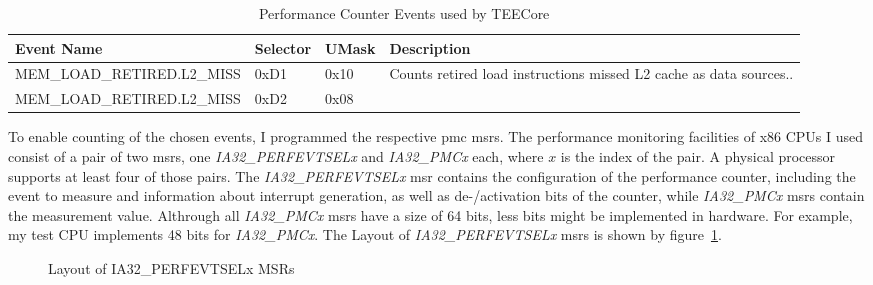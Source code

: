 \begin{table}[!h]
    \begin{center}
        \begin{tabular}{ |p{7cm}|p{1.35cm}|p{1.25cm}|p{3cm}| }
            \hline
            Event Name                  & Selector & UMask & Description                                                        \\
            \hline
            MEM\_LOAD\_RETIRED.L2\_MISS & 0xD1     & 0x10  & Counts retired load instructions missed L2 cache as data sources.. \\
            MEM\_LOAD\_RETIRED.L2\_MISS & 0xD2     & 0x08  &                                                                    \\
            \hline
        \end{tabular}
    \end{center}
    \label{tab:events}
    \caption{Performance Counter Events used by TEECore}
\end{table}

To enable counting of the chosen events, I programmed the respective \gls{pmc}
\glspl{msr}. The performance monitoring facilities of x86 CPUs I used  consist
of a pair of two \glspl{msr}, one \textit{IA32\_PERFEVTSELx} and
\textit{IA32\_PMCx} each, where $x$ is the index of the pair. A physical
processor supports at least four of those pairs. The \textit{IA32\_PERFEVTSELx}
\gls{msr} contains the configuration of the performance counter, including the
event to measure and information about interrupt generation, as well as
de-/activation bits of the counter, while \textit{IA32\_PMCx} \glspl{msr}
contain the measurement value. Althrough all \textit{IA32\_PMCx} \glspl{msr}
have a size of 64 bits, less bits might be implemented in hardware. For example,
my test CPU implements 48 bits for \textit{IA32\_PMCx}. The Layout of
\textit{IA32\_PERFEVTSELx} \glspl{msr} is shown by
figure~\ref{fig:state:technical:perfsel}.

\begin{center}
    \begin{figure}
        \centering
        
        \caption{Layout of IA32\_PERFEVTSELx MSRs}
        \label{fig:state:technical:perfsel}
    \end{figure}
\end{center}


